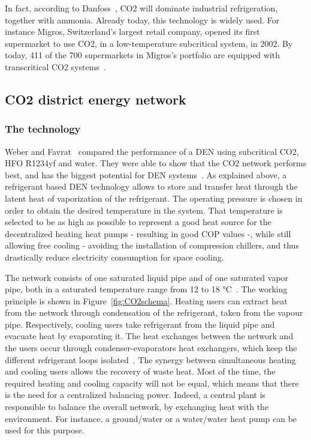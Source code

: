 \documentclass{article}
\begin{document}
In fact, according to Danfoss~\cite{danfossRefrigerantOptionsNow2017}, CO2 will dominate industrial refrigeration, together with ammonia. Already today, this technology is widely used. For instance Migros, Switzerland's largest retail company, opened its first supermarket to use CO2, in a low-temperature subcritical system, in 2002. By today, 411 of the 700 supermarkets in Migros’s portfolio are equipped with transcritical CO2 systems~\cite{williamsMigrosDNA2018}.


\subsection{CO2 district energy network}


\subsubsection{The technology}
Weber and Favrat~\cite{weberConventionalAdvancedCO22010} compared the performance of a DEN using subcritical CO2, HFO R1234yf and water. They were able to show that the CO2 network performs best, and has the biggest potential for DEN systems~\cite{henchozPotentialRefrigerantBased2016}. 
As explained above, a refrigerant based DEN technology allows to store and transfer heat through the latent heat of vaporization of the refrigerant. The operating pressure is chosen in order to obtain the desired temperature in the system. That temperature is selected to be as high as possible to represent a good heat source for the decentralized heating heat pumps - resulting in good COP values -, while still allowing free cooling - avoiding the installation of compression chillers, and thus drastically reduce electricity consumption for space cooling. 

The network consists of one saturated liquid pipe and of one saturated vapor pipe, both in a saturated temperature range from 12 to 18 \si{\celsius}~\cite{suciuEnergyIntegrationCO22018}.
The working principle is shown in Figure~\ref{fig:CO2schema}. Heating users can extract heat from the network through condensation of the refrigerant, taken from the vapour pipe. Respectively, cooling users take refrigerant from the liquid pipe and evacuate heat by evaporating it. The heat exchanges between the network and the users occur through condenser-evaporators heat exchangers, which keep the different refrigerant loops isolated~\cite{henchozPotentialRefrigerantBased2016}. The synergy between simultaneous heating and cooling users allows the recovery of waste heat. Most of the time, the required heating and cooling capacity will not be equal, which means that there is the need for a centralized balancing power. Indeed, a central plant is responsible to balance the overall network, by exchanging heat with the environment. For instance, a ground/water or a water/water heat pump can be used for this purpose.\\
\end{document}
